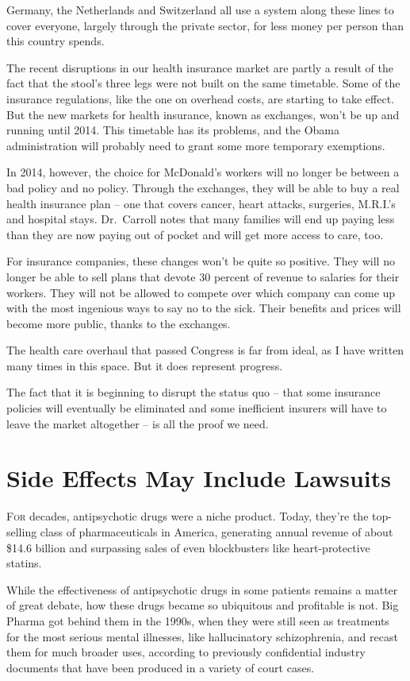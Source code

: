 ﻿\documentclass[12pt]{article}
\begin{document}
Germany, the Netherlands and Switzerland all use a system along these lines to cover everyone,
largely through the private sector, for less money per person than this country spends.

The recent disruptions in our health insurance market are partly a result of the fact that the
stool's three legs were not built on the same timetable. Some of the insurance regulations, like the
one on overhead costs, are starting to take effect. But the new markets for health insurance, known
as exchanges, won't be up and running until 2014. This timetable has its problems, and the Obama
administration will probably need to grant some more temporary exemptions.

In 2014, however, the choice for McDonald's workers will no longer be between a bad policy and no
policy. Through the exchanges, they will be able to buy a real health insurance plan -- one that
covers cancer, heart attacks, surgeries, M.R.I.'s and hospital stays. Dr.~Carroll notes that many
families will end up paying less than they are now paying out of pocket and will get more access to
care, too.

For insurance companies, these changes won't be quite so positive. They will no longer be able to
sell plans that devote 30 percent of revenue to salaries for their workers. They will not be allowed
to compete over which company can come up with the most ingenious ways to say no to the sick. Their
benefits and prices will become more public, thanks to the exchanges.

The health care overhaul that passed Congress is far from ideal, as I have written many times in
this space. But it does represent progress.

The fact that it is beginning to disrupt the status quo -- that some insurance policies will
eventually be eliminated and some inefficient insurers will have to leave the market altogether --
is all the proof we need.

\section{Side Effects May Include Lawsuits}

\lettrine{F}{or} decades, antipsychotic drugs were a niche product. Today,
they're the top-selling class of pharmaceuticals in America, generating annual revenue of about
\$14.6 billion and surpassing sales of even blockbusters like heart-protective statins.

While the effectiveness of antipsychotic drugs in some patients remains a matter of great debate,
how these drugs became so ubiquitous and profitable is not. Big Pharma got behind them in the 1990s,
when they were still seen as treatments for the most serious mental illnesses, like hallucinatory
schizophrenia, and recast them for much broader uses, according to previously confidential industry
documents that have been produced in a variety of court cases.
\end{document}
